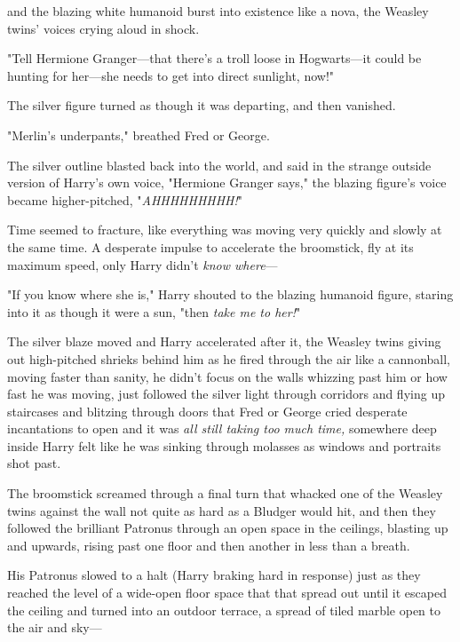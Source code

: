 and the blazing white humanoid burst into existence like a nova, the Weasley
twins' voices crying aloud in shock.

"Tell Hermione Granger---that there's a troll loose in Hogwarts---it could be
hunting for her---she needs to get into direct sunlight, now!"

The silver figure turned as though it was departing, and then vanished.

"Merlin's underpants," breathed Fred or George.

The silver outline blasted back into the world, and said in the strange outside
version of Harry's own voice, "Hermione Granger says," the blazing figure's
voice became higher-pitched, "\emph{AHHHHHHHHH!}"

Time seemed to fracture, like everything was moving very quickly and slowly at
the same time. A desperate impulse to accelerate the broomstick, fly at its
maximum speed, only Harry didn't \emph{know where}---

"If you know where she is," Harry shouted to the blazing humanoid figure,
staring into it as though it were a sun, "then \emph{take me to her!}"

The silver blaze moved and Harry accelerated after it, the Weasley twins giving
out high-pitched shrieks behind him as he fired through the air like a
cannonball, moving faster than sanity, he didn't focus on the walls whizzing
past him or how fast he was moving, just followed the silver light through
corridors and flying up staircases and blitzing through doors that Fred or
George cried desperate incantations to open and it was \emph{all still taking
too much time,} somewhere deep inside Harry felt like he was sinking through
molasses as windows and portraits shot past.

The broomstick screamed through a final turn that whacked one of the Weasley
twins against the wall not quite as hard as a Bludger would hit, and then they
followed the brilliant Patronus through an open space in the ceilings, blasting
up and upwards, rising past one floor and then another in less than a breath.

His Patronus slowed to a halt (Harry braking hard in response) just as they
reached the level of a wide-open floor space that that spread out until it
escaped the ceiling and turned into an outdoor terrace, a spread of tiled
marble open to the air and sky---
